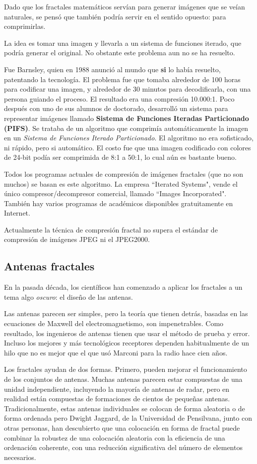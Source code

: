 Dado que los fractales matemáticos servían para generar imágenes que se veían naturales, se pensó que también podría servir en el sentido opuesto: para comprimirlas.

La idea es tomar una imagen y llevarla a un sistema de funciones iterado, que podría generar el original. No obstante este problema aun no se ha resuelto.

Fue Barnsley, quien en 1988 anunció al mundo que \textbf{si} lo había resuelto, patentando la tecnología. El problema fue que tomaba alrededor de 100 horas para codificar una imagen, y alrededor de 30 minutos para decodificarla, con una persona guiando el proceso. El resultado era una compresión 10.000:1. Poco después con uno de sus alumnos de doctorado, desarrolló un sistema para representar imágenes llamado \textbf{Sistema de Funciones Iteradas Particionado (PIFS)}. Se trataba de un algoritmo que comprimía automáticamente la imagen en un \emph{Sistema de Funciones Iterado Particionado}. El algoritmo no era sofisticado, ni rápido, pero si automático. El costo fue que una imagen codificado con colores de 24-bit podía ser comprimida de 8:1 a 50:1, lo cual aún es bastante bueno.

Todos los programas actuales de compresión de imágenes fractales (que no son muchos) se basan es este algoritmo. La empresa ``Iterated Systems", vende el único compresor/decompresor comercial, llamado ``Images Incorporated". También hay varios programas de académicos disponibles gratuitamente en Internet.

Actualmente la técnica de compresión fractal no supera el estándar de compresión de imágenes JPEG ni el JPEG2000.

\subsection{Antenas fractales}

En la pasada década, los científicos han comenzado a aplicar los fractales a un tema algo \emph{oscuro}: el diseño de las antenas.

Las antenas parecen ser simples, pero la teoría que tienen detrás, basadas en las ecuaciones de Maxwell del electromagnetismo, son impenetrables. Como resultado, los ingenieros de antenas tienen que usar el método de prueba y error. Incluso los mejores y más tecnológicos receptores dependen habitualmente de un hilo que no es mejor que el que usó Marconi para la radio hace cien años.

Los fractales ayudan de dos formas. Primero, pueden mejorar el funcionamiento de los conjuntos de antenas. Muchas antenas parecen estar compuestas de una unidad independiente, incluyendo la mayoría de antenas de radar, pero en realidad están compuestas de formaciones de cientos de pequeñas antenas. Tradicionalmente, estas antenas individuales se colocan de forma aleatoria o de forma ordenada pero Dwight Jaggard, de la Universidad de Pensilvana, junto con otras personas, han descubierto que una colocación en forma de fractal puede combinar la robustez de una colocación aleatoria con la eficiencia de una ordenación coherente, con una reducción significativa del número de elementos necesarios.

